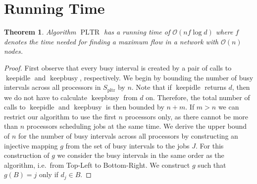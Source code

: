 \documentclass[a4paper]{article}
\DeclareMathOperator{\pltr}{pltr}
\DeclareMathOperator{\PLTR}{PLTR}
\DeclareMathOperator{\keepidle}{keepidle}
\DeclareMathOperator{\keepbusy}{keepbusy}
\newtheorem{theorem}{Theorem}
\begin{document}
\section{Running Time}\label{section:running_time}
\begin{theorem}\label{theorem:running_time}
  Algorithm $\PLTR$ has a running time of $\mathcal{O}(n f \log d)$ where $f$ denotes the time needed for finding a maximum flow in a network with $\mathcal{O}(n)$ nodes.
\end{theorem}
\begin{proof}
  First observe that every busy interval is created by a pair of calls to $\keepidle$ and $\keepbusy$, respectively.
  We begin by bounding the number of busy intervals across all processors in $S_{\pltr}$ by $n$.
  Note that if $\keepidle$ returns $d$, then we do not have to calculate $\keepbusy$ from $d$ on.
  Therefore, the total number of calls to $\keepidle$ and $\keepbusy$ is then bounded by $n + m$.
  If $m > n$ we can restrict our algorithm to use the first $n$ processors only, as there cannot be more than $n$ processors scheduling jobs at the same time.
  We derive the upper bound of $n$ for the number of busy intervals across all processors by constructing an injective mapping $g$ from the set of busy intervals to the jobs $J$.
  For this construction of $g$ we consider the busy intervals in the same order as the algorithm, i.e.\ from Top-Left to Bottom-Right.
  We construct $g$ such that $g(B) = j$ only if $d_j \in B$.


\end{proof}
\end{document}
